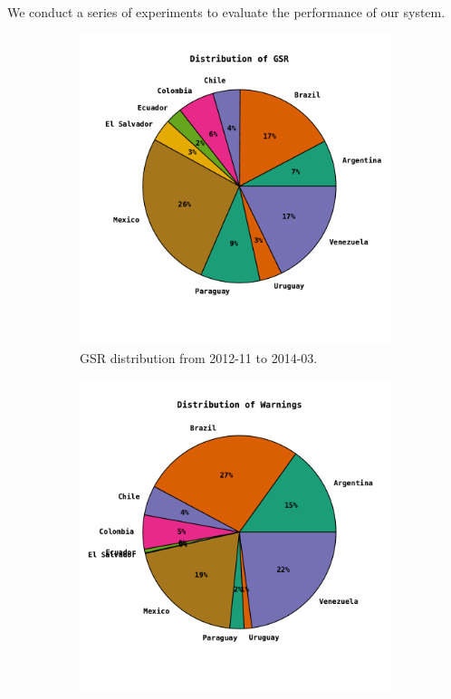 \documentclass[letterpaper]{article}
\begin{document}
We conduct a series of experiments to evaluate the performance of our system.\\

\begin{figure}
\centering
\begin{subfigure}{\columnwidth}
  \centering
  \includegraphics[scale=0.4]{gsr_distribution}
  \vspace{-2em}
  \caption{GSR distribution from 2012-11 to 2014-03.}
  \label{fig:gsrdistribution}
\end{subfigure}%
\begin{subfigure}{\columnwidth}
  \centering
  \includegraphics[scale=0.4]{pp_dist}

\end{subfigure}
\end{figure}
\end{document}
